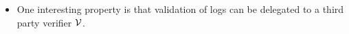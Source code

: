 \begin{frame}
  \begin{itemize}
    \item One interesting property is that validation of logs can be delegated 
      to a third party verifier \(\operatorname{\mathcal{V}}\).
  \end{itemize}
\end{frame}



\begin{frame}
  \small
  \printbibliography{}
\end{frame}

